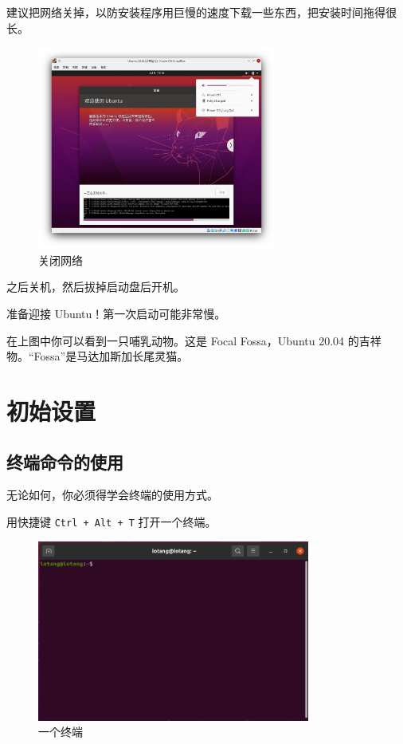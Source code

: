 \documentclass[UTF-8]{ctexart}
\begin{document}
				建议把网络关掉，以防安装程序用巨慢的速度下载一些东西，把安装时间拖得很长。
			
				\begin{figure}[H]
					\centering
					\includegraphics[width=0.7\textwidth]{fig/ubuntu_install_8.png}
					\caption*{关闭网络}
				\end{figure}
			
				之后关机，然后拔掉启动盘后开机。
				
				准备迎接 Ubuntu！第一次启动可能非常慢。
				
				在上图中你可以看到一只哺乳动物。这是 Focal Fossa，Ubuntu 20.04 的吉祥物。“Fossa”是马达加斯加长尾灵猫。
			
	\newpage
		
	\section{初始设置}
	
		\subsection{终端命令的使用}
		
			无论如何，你必须得学会终端的使用方式。
		
			用快捷键 \texttt{Ctrl + Alt + T} 打开一个终端。
			
			\begin{figure}[H]
				\centering
				\includegraphics[width=0.8\textwidth]{fig/terminal.png}
				\caption*{一个终端}
			\end{figure}
		
\end{document}
